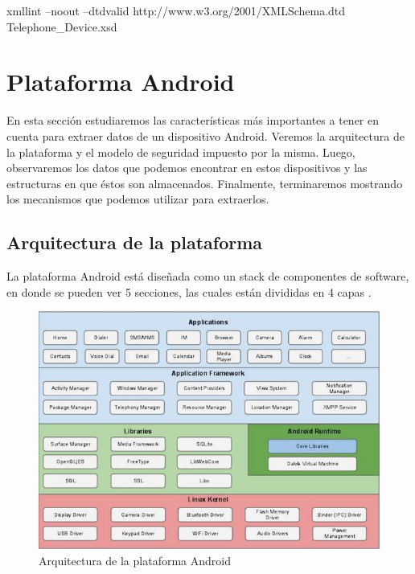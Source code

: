 \begin{bash}
xmllint --noout --dtdvalid http://www.w3.org/2001/XMLSchema.dtd Telephone_Device.xsd
\end{bash}

\section{Plataforma Android}
En esta sección estudiaremos las características más importantes a tener en cuenta para extraer datos de un dispositivo Android. Veremos la arquitectura de la plataforma y el modelo de seguridad impuesto por la misma. Luego, observaremos los datos que podemos encontrar en estos dispositivos y las estructuras en que éstos son almacenados. Finalmente, terminaremos mostrando los mecanismos que podemos utilizar para extraerlos.

\subsection{Arquitectura de la plataforma}
La plataforma Android está diseñada como un stack de componentes de software, en donde se pueden ver 5 secciones, las cuales están divididas en 4 capas \cite{androidArch}.
\newline

\begin{figure}[H]
    \begin{center}
        \includegraphics[scale=0.6]{figures/android_architecture}
        \caption{Arquitectura de la plataforma Android}
    \end{center}
\end{figure}


